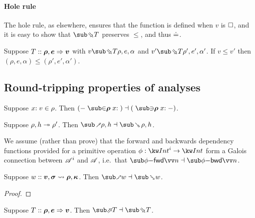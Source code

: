 \paragraph{Hole rule} The hole rule, as elsewhere, ensures that the function is defined when $v$ is $\square$, and it is easy to show that $\evalBwdF{T}$  preserves $\leq$, and thus $\doteq$.

\begin{lemma}
   Suppose $T :: \bm{\rho}, \bm{e} \Rightarrow \bm{v}$ with $v \evalBwdR{T} \rho, e, \alpha $ and $v' \evalBwdR{T} \rho', e', \alpha' $. If $v \leq v'$ then $(\rho, e, \alpha) \leq (\rho', e', \alpha')$.
\end{lemma}

\subsection{Round-tripping properties of analyses}
\label{sec:data-dependencies:analysis:galois-connections}


\begin{lemma}
\label{lem:core-language:env-get-put}Suppose $x{:}\;v\in{\rho}$. Then $(\envLookupFwdF{-}{\raw{\rho}}{x}{}) \adjoint (\envLookupBwdF{}{\raw{\rho}}{x}{-})$.
\end{lemma}

\begin{theorem}
\label{thm:core-language:closeDefs:gc}
   Suppose $\rho, h \twoheadrightarrow \rho'$.  Then ${\closeDefsFwdF{\rho,h}} \adjoint {\closeDefsBwdF{\rho,h}}$.
\end{theorem}

We assume (rather than prove) that the forward and backwards dependency functions provided for a primitive operation $\phi: \tyInt^i \to \tyInt$ form a Galois connection between $\mathscr{A}^i$ and $\mathscr{A}$, i.e.~that $\primFwdBool{\phi}{\vec{n}} \adjoint \primBwdBool{\phi}{\vec{n}}$.

\begin{theorem}
   \label{thm:core-language:match:gc}
      Suppose $w :: \bm{v}, \bm{\sigma} \rightsquigarrow \bm{\rho}, \bm{\kappa}$.  Then $\matchFwdF{w} \adjoint \matchBwdF{w}$.
\end{theorem}

\ifappendices
   \begin{proof}
   \end{proof}
\fi

\begin{theorem}
\label{thm:core-language:eval:gc}
   Suppose $T :: \bm{\rho}, \bm{e} \Rightarrow \bm{v}$.  Then $\evalFwdF{T} \adjoint \evalBwdF{T}$.
\end{theorem}
